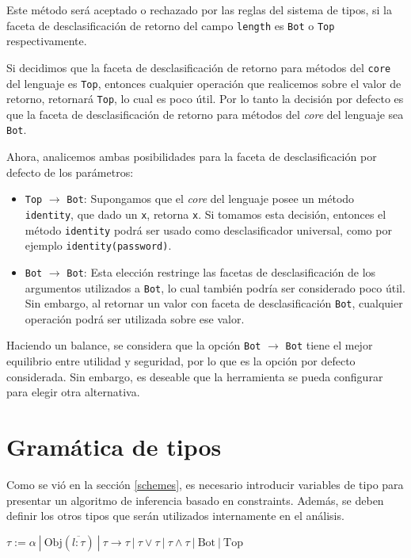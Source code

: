 Este método será aceptado o rechazado por las reglas del sistema de tipos, si la faceta de desclasificación de retorno del campo \texttt{length} es \texttt{Bot} o \texttt{Top} respectivamente.

Si decidimos que la faceta de desclasificación de retorno para métodos del \texttt{core} del lenguaje es \texttt{Top}, entonces cualquier operación que realicemos sobre el valor de retorno, retornará \texttt{Top}, lo cual es poco útil. Por lo tanto la decisión por defecto es que la faceta de desclasificación de retorno para métodos del \textit{core} del lenguaje sea \texttt{Bot}.

Ahora, analicemos ambas posibilidades para la faceta de desclasificación por defecto de los parámetros:

\begin{itemize}
  \item \texttt{Top} $\rightarrow$ \texttt{Bot}: Supongamos que el \textit{core} del lenguaje posee un método \texttt{identity}, que dado un \texttt{x}, retorna \texttt{x}. Si tomamos esta decisión, entonces el método \texttt{identity} podrá ser usado como desclasificador universal, como por ejemplo \texttt{identity(password)}.
  \item \texttt{Bot} $\rightarrow$ \texttt{Bot}: Esta elección restringe las facetas de desclasificación de los argumentos utilizados a \texttt{Bot}, lo cual también podría ser considerado poco útil. Sin embargo, al retornar un valor con faceta de desclasificación \texttt{Bot}, cualquier operación podrá ser utilizada sobre ese valor.
\end{itemize}

Haciendo un balance, se considera que la opción \texttt{Bot} $\rightarrow$ \texttt{Bot} tiene el mejor equilibrio entre utilidad y seguridad, por lo que es la opción por defecto considerada. Sin embargo, es deseable que la herramienta se pueda configurar para elegir otra alternativa.

\section{Gramática de tipos}
Como se vió en la sección \ref{schemes}, es necesario introducir variables de tipo para presentar un algoritmo de inferencia basado en constraints. Además, se deben definir los otros tipos que serán utilizados internamente en el análisis.

\begin{defn}
  \normalfont
  $\tau := \alpha\ |\ \text{Obj}(\overline{l: \tau})\ |\ \tau \rightarrow \tau \ |\ \tau \vee \tau\ |\ \tau \wedge \tau \ |\ \text{Bot}\ |\ \text{Top}$
\end{defn}

